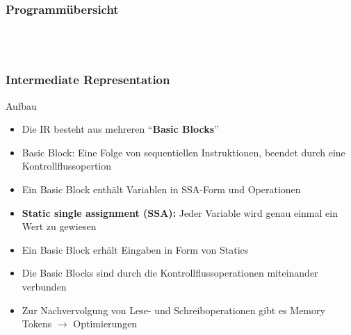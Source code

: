 \begin{frame}
    \frametitle{Programmübersicht}
    ~\\
    ~\\
\end{frame}


\begin{frame}
    \frametitle{Intermediate Representation}{Aufbau}
    \pause
    \begin{itemize}
        \item Die IR besteht aus mehreren "`\textbf{Basic Blocks}"'
              \pause
        \item Basic Block: Eine Folge von sequentiellen Instruktionen, beendet durch eine Kontrollflussopertion
              \pause
        \item Ein Basic Block enthält Variablen in SSA-Form und Operationen
              \pause
        \item \textbf{Static single assignment (SSA):} Jeder Variable wird genau einmal ein Wert zu gewiesen
              \pause
        \item Ein Basic Block erhält Eingaben in Form von Statics
              \pause
        \item Die Basic Blocks sind durch die Kontrollflussoperationen miteinander verbunden
              \pause
        \item Zur Nachvervolgung von Lese- und Schreiboperationen gibt es Memory Tokens $\rightarrow$ Optimierungen
    \end{itemize}
\end{frame}


